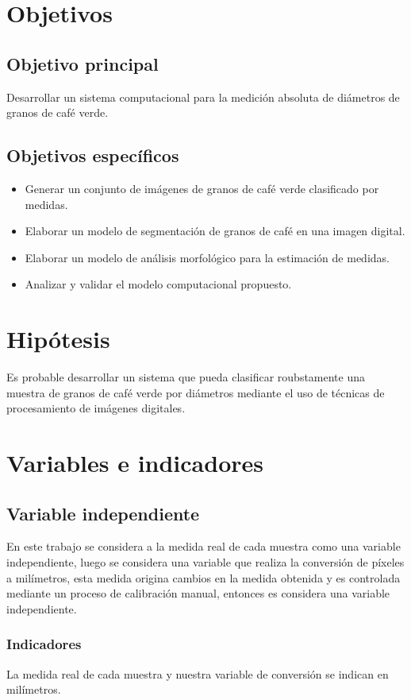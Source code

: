 \documentclass[12pt,a4paper,oneside]{book}
\begin{document}
\section{Objetivos}

\subsection{Objetivo principal}
Desarrollar un sistema computacional para la medición absoluta de diámetros de granos de café verde.

\subsection{Objetivos específicos}
\begin{itemize}
	\item Generar un conjunto de imágenes de granos de café verde clasificado por medidas.
	\item Elaborar un modelo de segmentación de granos de café en una imagen digital.
	\item Elaborar un modelo de análisis morfológico para la estimación de medidas.
	\item Analizar y validar el modelo computacional propuesto.
\end{itemize}

\section{Hipótesis}
Es probable desarrollar un sistema que pueda clasificar roubstamente una muestra de granos de café verde por diámetros mediante el uso de técnicas de procesamiento de imágenes digitales.

\section{Variables e indicadores}

\subsection{Variable independiente}
En este trabajo se considera a la medida real de cada muestra como una variable independiente, luego se considera una variable que realiza la conversión de píxeles a milímetros, esta medida origina cambios en la medida obtenida y es controlada mediante un proceso de calibración manual, entonces es considera una variable independiente.

\subsubsection{Indicadores}
La medida real de cada muestra y nuestra variable de conversión se indican en milímetros.
\end{document}
